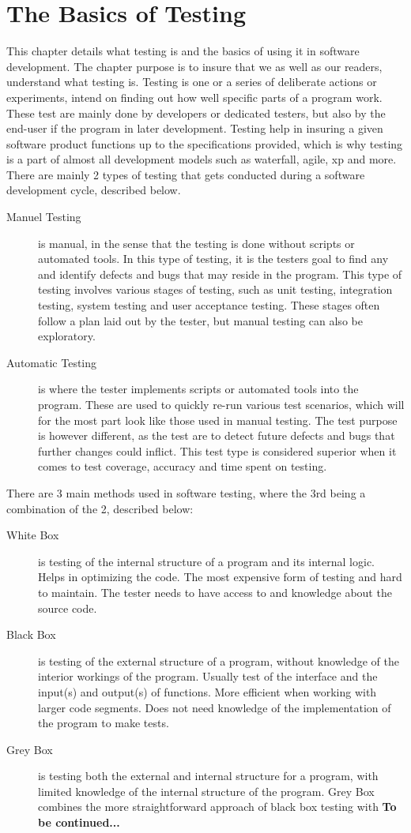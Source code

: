 \section{The Basics of Testing}
This chapter details what testing is and the basics of using it in software development. The chapter purpose is to insure that we as well as our readers, understand what testing is.
Testing is one or a series of deliberate actions or experiments, intend on finding out how well specific parts of a program work. These test are mainly done by developers or dedicated testers, but also by the end-user if the program in later development. 
Testing help in insuring a given software product functions up to the specifications provided, which is why testing is a part of almost all development models such as waterfall, agile, xp and more.
There are mainly 2 types of testing that gets conducted during a software development cycle\cite{BasicTesting1}, described below. 
\begin{description}
\item [Manuel Testing] is manual, in the sense that the testing is done without scripts or automated tools. In this type of testing, it is the testers goal to find any and identify defects and bugs that may reside in the program. This type of testing involves various stages of testing, such as unit testing, integration testing, system testing and user acceptance testing. These stages often follow a plan laid out by the tester, but manual testing can also be exploratory.  
\item [Automatic Testing] is where the tester implements scripts or automated tools into the program. These are used to quickly re-run various test scenarios, which will for the most part look like those used in manual testing. The test purpose is however different, as the test are to detect future defects and bugs that further changes could inflict. This test type is considered superior when it comes to test coverage, accuracy and time spent on testing.
\end{description}
There are 3 main methods used in software testing, where the 3rd being a combination of the 2, described below:
\begin{description}
\item [White Box] is testing of the internal structure of a program and its internal logic. Helps in optimizing the code. The most expensive form of testing and hard to maintain. The tester needs to have access to and knowledge about the source code.
\item [Black Box] is testing of the external structure of a program, without knowledge of the interior workings of the program. Usually test of the interface and the input(s) and output(s) of functions. More efficient when working with larger code segments. Does not need knowledge of the implementation of the program to make tests.
\item [Grey Box] is testing both the external and internal structure for a program, with limited knowledge of the internal structure of the program. Grey Box combines the more straightforward approach of black box testing with \textbf{To be continued...}
\end{description}




